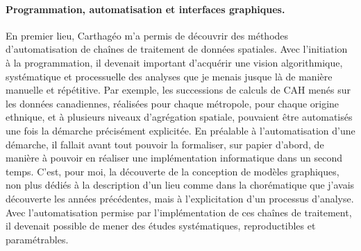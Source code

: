 \paragraph{Programmation, automatisation et interfaces graphiques.}

En premier lieu, Carthagéo m'a permis de découvrir des méthodes d'automatisation de chaînes de traitement de données spatiales.
Avec l'initiation à la programmation, il devenait important d'acquérir une vision algorithmique, systématique et processuelle des analyses que je menais jusque là de manière manuelle et répétitive.
Par exemple, les successions de calculs de CAH menés sur les données canadiennes, réalisées pour chaque métropole, pour chaque origine ethnique, et à plusieurs niveaux d'agrégation spatiale, pouvaient être automatisés une fois la démarche précisément explicitée.
En préalable à l'automatisation d'une démarche, il fallait avant tout pouvoir la formaliser, sur papier d'abord, de manière à pouvoir en réaliser une implémentation informatique dans un second temps.
C'est, pour moi, la découverte de la conception de modèles graphiques, non plus dédiés à la description d'un lieu comme dans la chorématique que j'avais découverte les années précédentes, mais à l'explicitation d'un processus d'analyse.
Avec l'automatisation permise par l'implémentation de ces chaînes de traitement, il devenait possible de mener des études systématiques, reproductibles et paramétrables.

